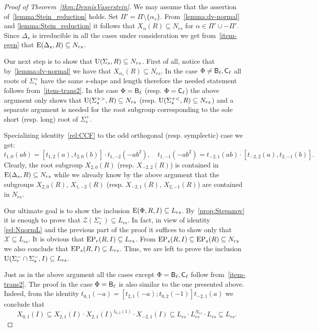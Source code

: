 \begin{proof}[Proof of Theorem~\ref{thm:DennisVaserstein}]
We may assume that the assertion of~\cref{lemma:Stein_reduction} holds.
Set $\Pi' = \Pi \setminus \{\alpha_s\}$.
From~\cref{lemma:dv-normal} and \cref{lemma:Stein_reduction} it follows that $X_\alpha(R) \subseteq N_{rs}$ for $\alpha \in \Pi' \cup -\Pi'$.
Since $\Delta_s$ is irreducible in all the cases under consideration we get from~\cref{item-egen} that $\operatorname{E}(\Delta_s, R) \subseteq N_{rs}$.

Our next step is to show that $\operatorname{U}(\Sigma_s, R) \subseteq N_{rs}$.
First of all, notice that by~\cref{lemma:dv-normal} we have that $X_{\alpha_s}(R) \subseteq N_{rs}$.
In the case $\Phi\neq \mathsf{B}_\ell, \mathsf{C}_\ell$ all roots of $\Sigma^+_s$ have the same $s$-shape and length therefore the needed statement follows from~\cref{item-trans2}.
In the case $\Phi=\mathsf{B}_\ell$ (resp. $\Phi=\mathsf{C}_\ell$) the above argument only shows that $\operatorname{U}(\Sigma_s^{+>}, R) \subseteq N_{rs}$ (resp. $\operatorname{U}(\Sigma_s^{+<}, R) \subseteq N_{rs}$)
and a separate argument is needed for the root subgroup corresponding to the sole short (resp. long) root of $\Sigma_s^+$.
 
Specializing identity~\ref{rel:CCF} to the odd orthogonal (resp. symplectic) case we get:
\begin{equation} \label{rel:CCF-specBC} t_{1,0}(ab) = [t_{1, 2}(a), t_{2, 0}(b)] \cdot t_{1,-2}(-a b^2), \quad t_{1,-1}(-ab^2) = t_{-2,1}(ab) \cdot [t_{-2, 2}(a), t_{2, -1}(b)]. \end{equation}
Clearly, the root subgroup $X_{2, 0}(R)$ (resp. $X_{-2,2}(R)$) is contained in $\operatorname{E}(\Delta_s, R) \subseteq N_{rs}$ while we already know by the above argument that the subgroups $X_{2, 0}(R)$, $X_{1,-2}(R)$
(resp. $X_{-2,1}(R)$, $X_{2,-1}(R)$) are contained in $N_{rs}$.

Our ultimate goal is to show the inclusion $\operatorname{E}(\Phi, R, I) \subseteq L_{rs}$. 
By~\cref{prop:Stepanov} it is enough to prove that $\mathcal{Z}(\Sigma^-_s) \subseteq L_{rs}$.
In fact, in view of identity \ref{rel:NnormL} and the previous part of the proof it suffices to show only that $\mathcal{X} \subseteq L_{rs}$.
It is obvious that $\operatorname{EP}_r(R, I) \subseteq L_{rs}$.
From $\operatorname{EP}_s(R, I) \subseteq \operatorname{EP}_s(R) \subseteq N_{rs}$ we also conclude that $\operatorname{EP}_s(R, I) \subseteq L_{rs}$.
Thus, we are left to prove the inclusion $\operatorname{U}(\Sigma^-_r \cap \Sigma^-_s, I) \subseteq L_{rs}$.

Just as in the above argument all the cases except $\Phi = \mathsf{B}_\ell, \mathsf{C}_\ell$ follow from~\cref{item-trans2}.
The proof in the case $\Phi=\mathsf{B}_\ell$ is also similar to the one presented above.
Indeed, from the identity $t_{0, 1}(-a) = [t_{2,1}(-a); t_{0, 2}(-1)] t_{-2,1}(a)$ we conclude that
$$X_{0,1}(I) \subseteq X_{2,1}(I) \cdot X_{2,1}(I)^{t_{0,2}(1)} \cdot X_{-2,1}(I) \subseteq L_{rs} \cdot L_{rs}^{N_{rs}} \cdot L_{rs} \subseteq L_{rs}.$$

\end{proof}
